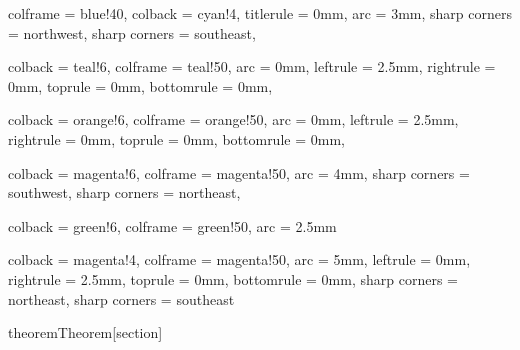 
{
    colframe = blue!40,
    colback = cyan!4,
    titlerule = 0mm,
    arc = 3mm,
    sharp corners = northwest, 
    sharp corners = southeast,
}

{
    colback = teal!6,
    colframe = teal!50,
    arc = 0mm,
    leftrule = 2.5mm,
    rightrule = 0mm,
    toprule = 0mm,
    bottomrule = 0mm,
}

{
    colback = orange!6,
    colframe = orange!50,
    arc = 0mm,
    leftrule = 2.5mm,
    rightrule = 0mm,
    toprule = 0mm,
    bottomrule = 0mm,
}

{
    colback = magenta!6,
    colframe = magenta!50,
    arc = 4mm,
    sharp corners = southwest,
    sharp corners = northeast,
}

{
    colback = green!6,
    colframe = green!50,
    arc = 2.5mm
}

{
    colback = magenta!4,
    colframe = magenta!50,
    arc = 5mm,
    leftrule = 0mm,
    rightrule = 2.5mm,
    toprule = 0mm,
    bottomrule = 0mm,
    sharp corners = northeast,
    sharp corners = southeast
}

\newenvironment{soln}
{
    \vspace{0.1cm}
    \textit{Solution.}
}{$\hfill \blacksquare$}

\newenvironment{soln-container}
{
    \vspace{0.1cm}
}

\newtheorem{theorem}{Theorem}[section]
\newtheorem{corollary}{Corollary}[theorem]
\newtheorem{clm}[theorem]{Claim}

\theoremstyle{remark}
\newtheorem{examples}{Example}[theorem]

\theoremstyle{definition}
\newtheorem{prob}{Problem}

